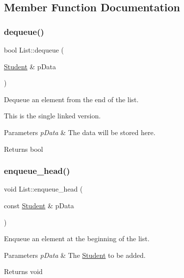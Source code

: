 \subsection{Member Function Documentation}
\mbox{\label{class_list_addc22172363ef656a20069489a1d003f}} 
\subsubsection{\texorpdfstring{dequeue()}{dequeue()}}
{\footnotesize\ttfamily bool List\+::dequeue (\begin{DoxyParamCaption}\item[{\hyperlink{class_student}{Student} \&}]{p\+Data }\end{DoxyParamCaption})}



Dequeue an element from the end of the list. 

This is the single linked version.


\begin{DoxyParams}{Parameters}
{\em p\+Data} & The data will be stored here. \\
\hline
\end{DoxyParams}
\begin{DoxyReturn}{Returns}
bool 
\end{DoxyReturn}
\mbox{\label{class_list_abe1c128f9a438009a7ebe1ff946963cf}} 
\subsubsection{\texorpdfstring{enqueue\+\_\+head()}{enqueue\_head()}}
{\footnotesize\ttfamily void List\+::enqueue\+\_\+head (\begin{DoxyParamCaption}\item[{const \hyperlink{class_student}{Student} \&}]{p\+Data }\end{DoxyParamCaption})}



Enqueue an element at the beginning of the list. 


\begin{DoxyParams}{Parameters}
{\em p\+Data} & The \hyperlink{class_student}{Student} to be added. \\
\hline
\end{DoxyParams}
\begin{DoxyReturn}{Returns}
void 
\end{DoxyReturn}
\mbox{\label{class_list_a9cd9aa3b710f2c17acbc41a9c376f337}} 

